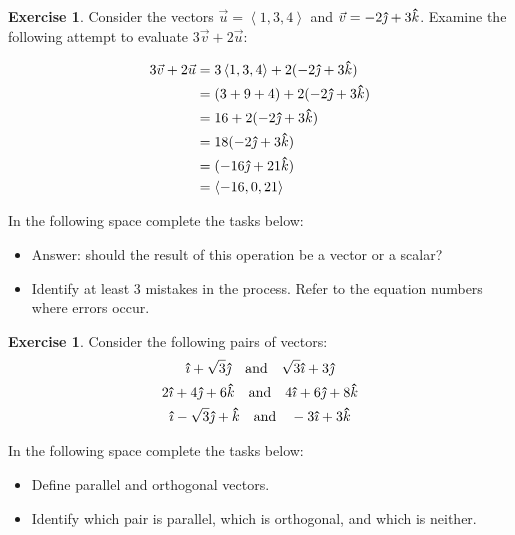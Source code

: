 \documentclass[12pt]{article}
\theoremstyle{plain}
\theoremstyle{definition}
\newtheorem{Ej}[Th]{Exercise}         %
\theoremstyle{remark}
\newcommand{\thickhat}[1]{\mathbf{\hat{\text{$#1$}}}}
\newcommand{\ii}{\vu{\imath}}
\newcommand{\jj}{\vu{\jmath}}
\newcommand{\kk}{\thickhat{k}}
\renewcommand{\:}{\colon}           %
\renewcommand{\.}{\Cdot}                %
\newcommand{\br}[1]{\left\langle #1\right\rangle}
\begin{document}

  \begin{Ej}
    Consider the vectors $\vec{u} = \br{1, 3, 4}$ and $\vec{v} = -2\jj + 3\kk$. Examine the following attempt to evaluate $3\vec{v} + 2\vec{u}$:
    \begin{ptcb}
    \begin{align}
        3\vec{v} + 2\vec{u} &= 3\br{1, 3, 4} + 2(-2\jj + 3\kk) \\
        &= (3 + 9 + 4) + 2(-2\jj + 3\kk) \\
        &= 16 + 2(-2\jj + 3\kk) \\
        &= 18(-2\jj + 3\kk) \\
        &= (-16\jj + 21\kk) \\
        &= \br{-16, 0, 21}
      \end{align}
    \end{ptcb}
    
    In the following space complete the tasks below:
    \begin{itemize}[itemsep=0em]
      \item Answer: should the result of this operation be a vector or a scalar?
      \item Identify at least 3 mistakes in the process. Refer to the equation numbers where errors occur.
    \end{itemize}
  \end{Ej}
  
  \begin{ptcb}
    \vspace{5.3cm}
  \end{ptcb}
  
  \begin{Ej}
    Consider the following pairs of vectors:
    \setcounter{equation}{0}
    \begin{gather}
      \ii + \sqrt{3}\jj \quad \text{and} \quad \sqrt{3}\ii + 3\jj \\
      2\ii + 4\jj + 6\kk \quad \text{and} \quad 4\ii + 6\jj + 8\kk \\
      \ii - \sqrt{3}\jj + \kk \quad \text{and} \quad -3\ii + 3\kk
    \end{gather}
  
    In the following space complete the tasks below:
    \begin{itemize}[itemsep=0em]
      \item Define parallel and orthogonal vectors.
      \item Identify which pair is parallel, which is orthogonal, and which is neither.
    \end{itemize}
  \end{Ej}
  
\end{document}
